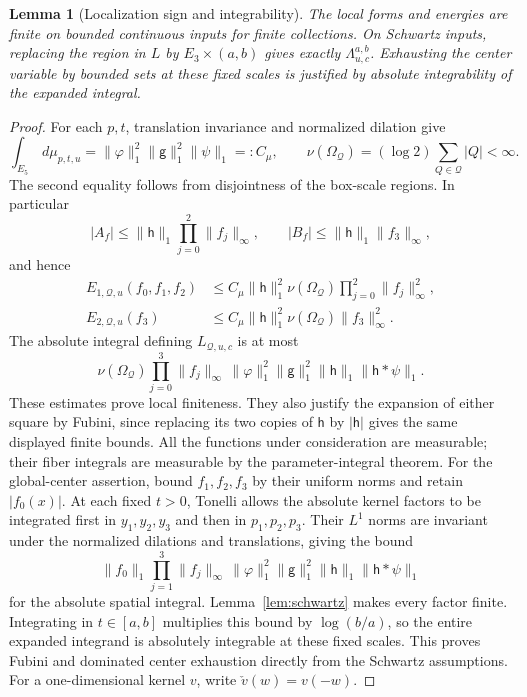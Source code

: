 \documentclass[12pt,reqno]{amsart}
\theoremstyle{plain}
\newtheorem{lemma}[theorem]{Lemma}
\theoremstyle{definition}
\theoremstyle{remark}
\numberwithin{equation}{section}
\newcommand{\g}{\mathsf g}
\newcommand{\h}{\mathsf h}
\newcommand{\dd}{\,d}
\begin{document}
\begin{lemma}[Localization sign and integrability]\label{lem:localization}
The local forms and energies are finite on bounded continuous inputs
for finite collections. On Schwartz inputs, replacing the region in
$L$ by $E_3\times(a,b)$ gives exactly $\Lambda^{a,b}_{u,c}$.
Exhausting the center variable by bounded sets at these fixed scales
is justified by absolute integrability of the expanded integral.
\end{lemma}
\begin{proof}
For each $p,t$, translation invariance and normalized dilation give
\[
 \int_{E_5}\dd\mu_{p,t,u}
   =\|\varphi\|_1^2\|\g\|_1^2\|\psi\|_1=:C_\mu,
 \qquad
 \nu(\Omega_{\mathcal Q})=(\log2)\sum_{Q\in\mathcal Q}|Q|<\infty.
\]
The second equality follows from disjointness of the box-scale
regions. In particular
\[
 |A_f|\le\|\h\|_1\prod_{j=0}^2\|f_j\|_\infty,
 \qquad |B_f|\le\|\h\|_1\|f_3\|_\infty,
\]
and hence
\begin{align*}
 E_{1,\mathcal Q,u}(f_0,f_1,f_2)
 &\le C_\mu\|\h\|_1^2\nu(\Omega_{\mathcal Q})
                                     \prod_{j=0}^2\|f_j\|_\infty^2,\\
 E_{2,\mathcal Q,u}(f_3)
 &\le C_\mu\|\h\|_1^2\nu(\Omega_{\mathcal Q})\|f_3\|_\infty^2.
\end{align*}
The absolute integral defining $L_{\mathcal Q,u,c}$ is at most
\[
 \nu(\Omega_{\mathcal Q})\prod_{j=0}^3\|f_j\|_\infty\,
 \|\varphi\|_1^2\|\g\|_1^2\|\h\|_1\|\h*\psi\|_1.
\]
These estimates prove local finiteness. They also justify the
expansion of either square by Fubini, since replacing its two
copies of $\h$ by $|\h|$ gives the same displayed finite bounds.
All the functions under consideration are measurable; their fiber
integrals are measurable by the parameter-integral theorem.
For the global-center assertion, bound $f_1,f_2,f_3$ by their
uniform norms and retain $|f_0(x)|$. At each fixed $t>0$, Tonelli
allows the absolute kernel factors to be integrated first in
$y_1,y_2,y_3$ and then in $p_1,p_2,p_3$. Their $L^1$ norms are
invariant under the normalized dilations and translations, giving
the bound
\[
 \|f_0\|_1\prod_{j=1}^3\|f_j\|_\infty\,
 \|\varphi\|_1^2\|\g\|_1^2\|\h\|_1\|\h*\psi\|_1
\]
for the absolute spatial integral. Lemma~\ref{lem:schwartz} makes
every factor finite. Integrating in $t\in[a,b]$ multiplies this
bound by $\log(b/a)$, so the entire expanded integrand is absolutely
integrable at these fixed scales. This proves Fubini and dominated
center exhaustion directly from the Schwartz assumptions.
For a one-dimensional kernel $v$, write $\check v(w)=v(-w)$.

\end{proof}
\end{document}
